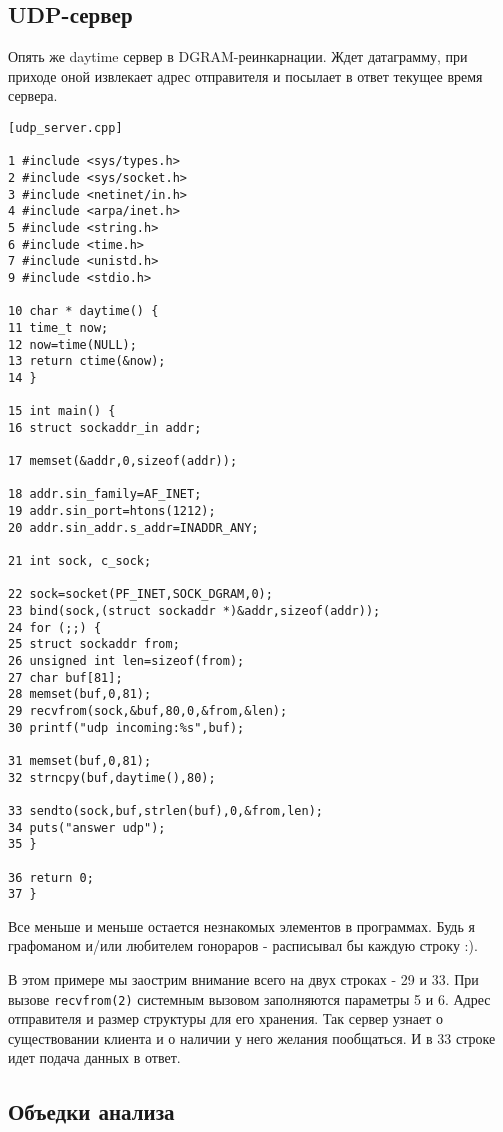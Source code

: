 \subsection{UDP-сервер}

Опять же daytime сервер в DGRAM-реинкарнации. Ждет датаграмму, при приходе оной извлекает адрес отправителя и посылает в ответ текущее время сервера.
\begin{verbatim}
[udp_server.cpp]

1 #include <sys/types.h>
2 #include <sys/socket.h>
3 #include <netinet/in.h>
4 #include <arpa/inet.h>
5 #include <string.h>
6 #include <time.h>
7 #include <unistd.h>
9 #include <stdio.h>

10 char * daytime() {
11 time_t now;
12 now=time(NULL);
13 return ctime(&now);
14 }

15 int main() {
16 struct sockaddr_in addr;

17 memset(&addr,0,sizeof(addr));

18 addr.sin_family=AF_INET;
19 addr.sin_port=htons(1212);
20 addr.sin_addr.s_addr=INADDR_ANY;

21 int sock, c_sock;

22 sock=socket(PF_INET,SOCK_DGRAM,0);
23 bind(sock,(struct sockaddr *)&addr,sizeof(addr));
24 for (;;) {
25 struct sockaddr from;
26 unsigned int len=sizeof(from);
27 char buf[81];
28 memset(buf,0,81);
29 recvfrom(sock,&buf,80,0,&from,&len);
30 printf("udp incoming:%s",buf);

31 memset(buf,0,81);
32 strncpy(buf,daytime(),80);

33 sendto(sock,buf,strlen(buf),0,&from,len);
34 puts("answer udp");
35 }

36 return 0;
37 }
\end{verbatim}

Все меньше и меньше остается незнакомых элементов в программах. Будь я графоманом и/или любителем гонораров - расписывал бы каждую строку :).

В этом примере мы заострим внимание всего на двух строках - 29 и 33. При вызове \verb+recvfrom(2)+ системным вызовом заполняются параметры 5 и 6. Адрес отправителя и размер структуры для его хранения. Так сервер узнает о существовании клиента и о наличии у него желания пообщаться. И в 33 строке идет подача данных в ответ.

\subsection{Объедки анализа}

